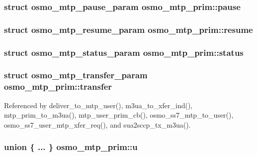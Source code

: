 \subsubsection[{pause}]{\setlength{\rightskip}{0pt plus 5cm}struct {\bf osmo\+\_\+mtp\+\_\+pause\+\_\+param} osmo\+\_\+mtp\+\_\+prim\+::pause}\label{structosmo__mtp__prim_abe354714a09a9468b4ca559de1c2fb25}
\subsubsection[{resume}]{\setlength{\rightskip}{0pt plus 5cm}struct {\bf osmo\+\_\+mtp\+\_\+resume\+\_\+param} osmo\+\_\+mtp\+\_\+prim\+::resume}\label{structosmo__mtp__prim_a612e191f10b9f1395c11deeafd0479db}
\subsubsection[{status}]{\setlength{\rightskip}{0pt plus 5cm}struct {\bf osmo\+\_\+mtp\+\_\+status\+\_\+param} osmo\+\_\+mtp\+\_\+prim\+::status}\label{structosmo__mtp__prim_a252ffe68ce38f38f281264b1731b7702}
\subsubsection[{transfer}]{\setlength{\rightskip}{0pt plus 5cm}struct {\bf osmo\+\_\+mtp\+\_\+transfer\+\_\+param} osmo\+\_\+mtp\+\_\+prim\+::transfer}\label{structosmo__mtp__prim_aa50cfd1e1d3c48f01c62d4c793d26db8}


Referenced by deliver\+\_\+to\+\_\+mtp\+\_\+user(), m3ua\+\_\+to\+\_\+xfer\+\_\+ind(), mtp\+\_\+prim\+\_\+to\+\_\+m3ua(), mtp\+\_\+user\+\_\+prim\+\_\+cb(), osmo\+\_\+ss7\+\_\+mtp\+\_\+to\+\_\+user(), osmo\+\_\+ss7\+\_\+user\+\_\+mtp\+\_\+xfer\+\_\+req(), and sua2sccp\+\_\+tx\+\_\+m3ua().

\subsubsection[{u}]{\setlength{\rightskip}{0pt plus 5cm}union \{ ... \}   osmo\+\_\+mtp\+\_\+prim\+::u}\label{structosmo__mtp__prim_af89958fb9e8fd234603f4194a5678c40}


